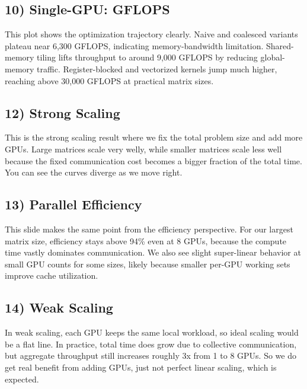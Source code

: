 \documentclass[11pt]{article}
\begin{document}
\subsection*{10) Single-GPU: GFLOPS}
This plot shows the optimization trajectory clearly. Naive and coalesced variants plateau near 6,300 GFLOPS, indicating memory-bandwidth limitation. Shared-memory tiling lifts throughput to around 9,000 GFLOPS by reducing global-memory traffic. Register-blocked and vectorized kernels jump much higher, reaching above 30,000 GFLOPS at practical matrix sizes.


\subsection*{12) Strong Scaling}
This is the strong scaling result where we fix the total problem size and add more GPUs. Large matrices scale very welly, while smaller matrices scale less well because the fixed communication cost becomes a bigger fraction of the total time. You can see the curves diverge as we move right.

\subsection*{13) Parallel Efficiency}
This slide makes the same point from the efficiency perspective. For our largest matrix size, efficiency stays above 94\% even at 8 GPUs, because the compute time vastly dominates communication. We also see slight super-linear behavior at small GPU counts for some sizes, likely because smaller per-GPU working sets improve cache utilization.

\subsection*{14) Weak Scaling}
In weak scaling, each GPU keeps the same local workload, so ideal scaling would be a flat line. In practice, total time does grow due to collective communication, but aggregate throughput still increases roughly 3x from 1 to 8 GPUs. So we do get real benefit from adding GPUs, just not perfect linear scaling, which is expected.
\end{document}

